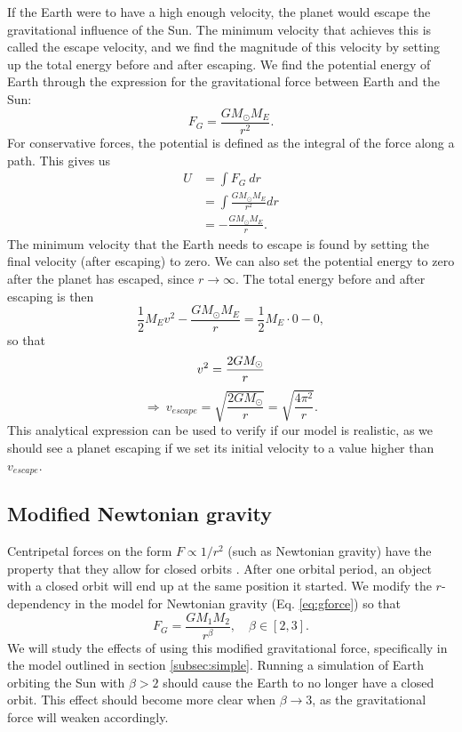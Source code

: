 \documentclass{emulateapj}
\begin{document}
If the Earth were to have a high enough velocity, the planet would escape the gravitational influence of the Sun. The minimum velocity that achieves this is called the escape velocity, and we find the magnitude of this velocity by setting up the total energy before and after escaping. We find the potential energy of Earth through the expression for the gravitational force between Earth and the Sun:
%
\begin{equation*}
    F_G = \frac{G M_\odot M_E}{r^2}.
\end{equation*}
%
For conservative forces, the potential is defined as the integral of the force along a path. This gives us 
%
\begin{align*}
    U & = \int F_G \ dr \\
    & = \int \frac{G M_\odot M_E}{r^2} dr \\
    & = -\frac{G M_\odot M_E}{r}.
\end{align*}
%
The minimum velocity that the Earth needs to escape is found by setting the final velocity (after escaping) to zero. We can also set the potential energy to zero after the planet has escaped, since $r \rightarrow \infty$. The total energy before and after escaping is then 
%
\begin{equation*}
    \frac{1}{2}M_E v^2 -\frac{G M_\odot M_E}{r} = \frac{1}{2}M_E \cdot 0 - 0,
\end{equation*}
%
so that 
%
\begin{equation}
    v^2 =\frac{2G M_\odot}{r} \\
\end{equation}
%
\begin{equation}\label{eq:esc_vel}
     \Rightarrow \ v_{escape} = \sqrt{\frac{2G M_\odot}{r} } = \sqrt{\frac{4\pi^2}{r}}.
\end{equation}
%
This analytical expression can be used to verify if our model is realistic, as we should see a planet escaping if we set its initial velocity to a value higher than $v_{escape}$.


\subsection{Modified Newtonian gravity}
\label{subsec:modified_gravity}

Centripetal forces on the form $F \propto 1/r^2$ (such as Newtonian gravity) have the property that they allow for closed orbits \cite{bib:project3}. After one orbital period, an object with a closed orbit will end up at the same position it started. We modify the $r$-dependency in the model for Newtonian gravity (Eq. \eqref{eq:gforce}) so that
%
\begin{equation}
    F_G = \frac{G M_1 M_2}{r^\beta}, \quad \beta \in \left[2,3\right].
\end{equation}
%
We will study the effects of using this modified gravitational force, specifically in the model outlined in section \ref{subsec:simple}. Running a simulation of Earth orbiting the Sun with $\beta > 2$ should cause the Earth to no longer have a closed orbit. This effect should become more clear when $\beta \rightarrow 3$, as the gravitational force will weaken accordingly.
\end{document}
